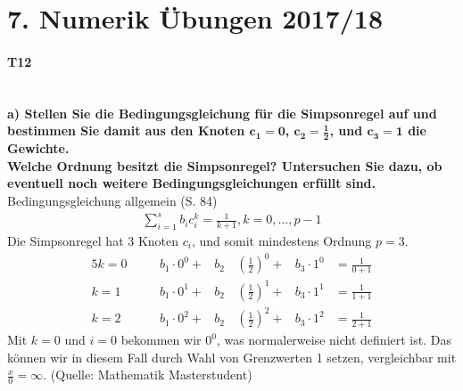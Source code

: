 \documentclass[10pt,a4paper]{article}
\begin{document}
	\section*{7. Numerik Übungen 2017/18}
	\paragraph{T12}\mbox{}\\
	\textbf{%
		a) Stellen Sie die Bedingungsgleichung für die Simpsonregel auf und bestimmen Sie damit aus den Knoten $\mathbf{c_1=0}$, $\mathbf{c_2=\frac{1}{2}}$, und $\mathbf{c_3=1}$ die Gewichte.\\
        Welche Ordnung besitzt die Simpsonregel? Untersuchen Sie dazu, ob eventuell noch weitere Bedingungsgleichungen erfüllt sind.
	}\\
    Bedingungsgleichung allgemein (S. 84)
	\begin{align}\tag{4.31}
		\sum\limits_{i=1}^{s}b_ic_i^k = \frac{1}{k+1}, k=0, \dots, p-1
	\end{align}
	Die Simpsonregel hat 3 Knoten $c_i$, und somit mindestens Ordnung $p = 3$.
	\begin{alignat*}{5}
		k=0 & \quad & b_1\cdot 0^0+ & b_2 \, & \left(\frac{1}{2}\right)^0+ & b_3\cdot1^0 & = \frac{1}{0+1} \\
		k=1 & \quad & b_1\cdot 0^1+ & b_2 \, & \left(\frac{1}{2}\right)^1+ & b_3\cdot1^1 & = \frac{1}{1+1} \\
		k=2 & \quad & b_1\cdot 0^2+ & b_2 \, & \left(\frac{1}{2}\right)^2+ & b_3\cdot1^2 & = \frac{1}{2+1}
		\end{alignat*}
		Mit $k=0$ und $i=0$ bekommen wir $0^0$, was normalerweise nicht definiert ist. Das können wir in diesem Fall durch Wahl von Grenzwerten 1 setzen, vergleichbar mit $\frac{x}{0}=\infty$. (Quelle: Mathematik Masterstudent)
\end{document}

